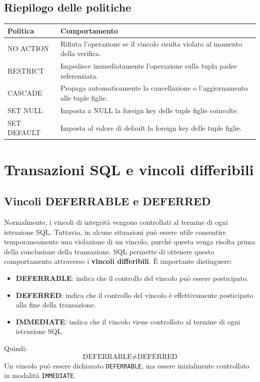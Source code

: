 \subsection{Riepilogo delle politiche}
\begin{center}
\begin{tabular}{|l|p{8cm}|}
\hline
\textbf{Politica} & \textbf{Comportamento} \\
\hline
NO ACTION &
Rifiuta l'operazione se il vincolo
risulta violato al momento della verifica. \\
\hline
RESTRICT &
Impedisce immediatamente l'operazione
sulla tupla padre referenziata. \\
\hline
CASCADE &
Propaga automaticamente la cancellazione
o l'aggiornamento alle tuple figlie. \\
\hline
SET NULL &
Imposta a NULL la foreign key
delle tuple figlie coinvolte. \\
\hline
SET DEFAULT &
Imposta al valore di default
la foreign key delle tuple figlie. \\
\hline
\end{tabular}
\end{center}

\section{Transazioni SQL e vincoli differibili}
\subsection{Vincoli DEFERRABLE e DEFERRED}
Normalmente, i vincoli di integrità
vengono controllati al termine
di ogni istruzione SQL.
Tuttavia, in alcune situazioni
può essere utile consentire
temporaneamente una violazione
di un vincolo, purché questa
venga risolta prima della
conclusione della transazione.
SQL permette di ottenere questo
comportamento attraverso i
\textbf{vincoli differibili}.
È importante distinguere:
\begin{itemize}
    \item \textbf{DEFERRABLE}: indica
    che il controllo del vincolo
    può essere posticipato.

    \item \textbf{DEFERRED}: indica
    che il controllo del vincolo
    è effettivamente posticipato
    alla fine della transazione.

    \item \textbf{IMMEDIATE}: indica
    che il vincolo viene controllato
    al termine di ogni istruzione SQL.
\end{itemize}
\noindent Quindi:
\[
\boxed{
\text{DEFERRABLE}
\neq
\text{DEFERRED}
}
\]
Un vincolo può essere dichiarato
\texttt{DEFERRABLE}, ma essere
inizialmente controllato in
modalità \texttt{IMMEDIATE}.
